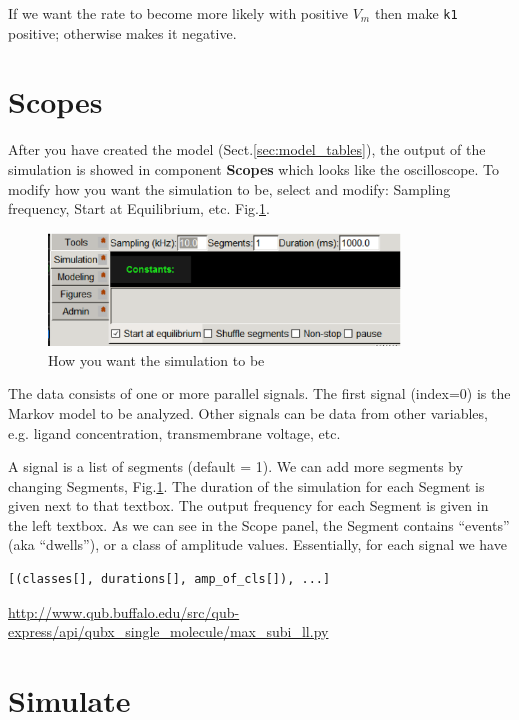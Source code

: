 If we want the rate to become more likely with positive $V_m$ then make
\verb!k1! positive; otherwise makes it negative.

\section{Scopes}

After you have created the model (Sect.\ref{sec:model_tables}), the output of
the simulation is showed in component {\bf Scopes} which looks like the
oscilloscope. To modify how you want the simulation to be, select and
modify: Sampling frequency, Start at Equilibrium, etc.
Fig.\ref{fig:QuB_Express_03}.


\begin{figure}[hbt]
  \centerline{\includegraphics[height=3cm,
    angle=0]{./images/QuB_Express_03.eps}}
  \caption{How you want the simulation to be}
  \label{fig:QuB_Express_03}
\end{figure}


The data consists of one or more parallel signals. The first signal (index=0) is
the Markov model to be analyzed. Other signals can be data from other variables,
e.g. ligand concentration, transmembrane voltage, etc.

A signal is a list of segments (default = 1). We can add more segments by
changing Segments, Fig.\ref{fig:QuB_Express_03}. The duration of the simulation
for each Segment is given next to that textbox. The output frequency for each
Segment is given in the left textbox. As we can see in the Scope panel, the
Segment contains ``events'' (aka ``dwells''), or a class of amplitude values.
Essentially, for each signal we have
\begin{verbatim}
[(classes[], durations[], amp_of_cls[]), ...]
\end{verbatim}

\url{http://www.qub.buffalo.edu/src/qub-express/api/qubx_single_molecule/max_subi_ll.py}

\section{Simulate}

